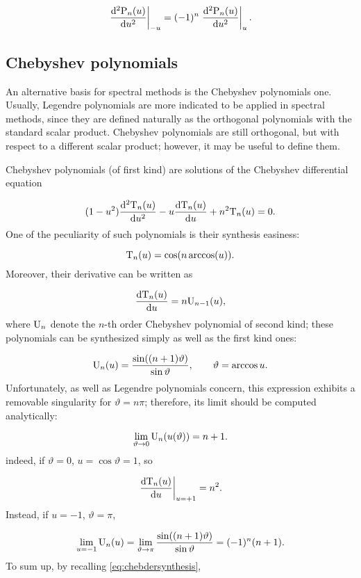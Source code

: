 \documentclass[a4paper,12pt]{article}
\begin{document}
\[
\left. \frac{\mathrm{d}^2 \mathrm{P}_n(u)}{\mathrm{d} u^2} \right|_{-u} = (-1)^n \left. \frac{\mathrm{d}^2 \mathrm{P}_n(u)}{\mathrm{d} u^2} \right|_{u}.
\]

\subsection{Chebyshev polynomials}

An alternative basis for spectral methods is the Chebyshev polynomials one. Usually, Legendre polynomials are more indicated to be applied in spectral methods, since they are defined naturally as the orthogonal polynomials with the standard scalar product. Chebyshev polynomials are still orthogonal, but with respect to a different scalar product; however, it may be useful to define them.

Chebyshev polynomials (of first kind) are solutions of the Chebyshev differential equation

\begin{equation}
(1-u^2) \frac{\mathrm{d}^2 \mathrm{T}_n(u)}{\mathrm{d} u^2} - u \frac{\mathrm{d} \mathrm{T}_n(u)}{\mathrm{d} u} + n^2 \mathrm{T}_n(u) = 0.
\label{eq:chebyshevdiff}
\end{equation}
One of the peculiarity of such polynomials is their synthesis easiness:

\begin{equation}
\mathrm{T}_n(u) = \cos(n \arccos(u)).
\label{eq:chebsynthesis}
\end{equation}
Moreover, their derivative can be written as

\begin{equation}
\frac{\mathrm{d} \mathrm{T}_n(u)}{\mathrm{d} u} = n \mathrm{U}_{n-1}(u),
\label{eq:chebdersynthesis}
\end{equation}
where $\mathrm{U}_n$ denote the $n$-th order Chebyshev polynomial of second kind; these polynomials can be synthesized simply as well as the first kind ones:

\[
\mathrm{U}_n(u) = \frac{\sin((n+1) \vartheta)}{\sin \vartheta}, ~~~~~~ \vartheta = \arccos u.
\]
Unfortunately, as well as Legendre polynomials concern, this expression exhibits a removable singularity for $\vartheta = n \pi$; therefore, its limit should be computed analytically:

\[
\lim_{\vartheta \rightarrow 0} \mathrm{U}_n(u(\vartheta)) = n+1.
\]
indeed, if $\vartheta=0$, $u = \cos \vartheta = 1$, so

\[
\left. \frac{\mathrm{d} \mathrm{T}_n(u)}{\mathrm{d} u} \right|_{u=+1} = n^2.
\]
Instead, if $u = -1$, $\vartheta = \pi$,

\[
\lim_{u = -1} \mathrm{U}_n(u) = \lim_{\vartheta \rightarrow \pi} \frac{\sin((n+1) \vartheta)}{\sin \vartheta} = (-1)^n (n+1).
\]
To sum up, by recalling \eqref{eq:chebdersynthesis},
\end{document}
